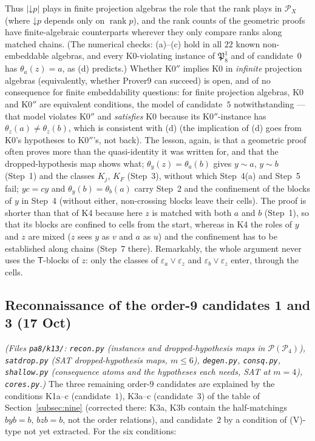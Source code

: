\documentclass[11pt]{amsart}
\theoremstyle{definition}
\renewcommand{\P}{\mathcal{P}}
\newcommand{\T}{\mathsf{T}}
\newcommand{\rk}{\operatorname{rank}}
\begin{document}
Thus $|\mathord\downarrow p|$ plays in finite projection algebras the role that the rank plays in $\P_X$ (where $\mathord\downarrow p$ depends only on $\rk p$), and the rank counts of the geometric proofs have finite-algebraic counterparts wherever they only compare ranks along matched chains. (The numerical checks: (a)--(c) hold in all $22$ known non-embeddable algebras, and every K0-violating instance of $\mathfrak P_8^1$ and of candidate~$0$ has $\theta_a(z)=a$, as (d) predicts.) Whether K0$''$ implies K0 in \emph{infinite} projection algebras (equivalently, whether Prover9 can succeed) is open, and of no consequence for finite embeddability questions: for finite projection algebras, K0 and K0$''$ are equivalent conditions, the model of candidate~$5$ notwithstanding --- that model violates K0$''$ and \emph{satisfies} K0 because its K0$''$-instance has $\theta_z(a)\ne\theta_z(b)$, which is consistent with (d) (the implication of (d) goes from K0's hypotheses to K0$''$'s, not back). The lesson, again, is that a geometric proof often proves more than the quasi-identity it was written for, and that the dropped-hypothesis map shows what; $\theta_y(z)=\theta_a(b)$ gives $y\sim a$, $y\sim b$ (Step~1) and the classes $K_j$, $K_F$ (Step~3), without which Step~4(a) and Step~5 fail; $yc=cy$ and $\theta_y(b)=\theta_b(a)$ carry Step~2 and the confinement of the blocks of $y$ in Step~4 (without either, non-crossing blocks leave their cells). The proof is shorter than that of K4 because here $z$ is matched with both $a$ and $b$ (Step~1), so that its blocks are confined to cells from the start, whereas in K4 the roles of $y$ and $z$ are mixed ($z$ sees $y$ as $v$ and $a$ as $u$) and the confinement has to be established along chains (Step~7 there). Remarkably, the whole argument never uses the $\T$-blocks of $z$: only the classes of $\varepsilon_a\vee\varepsilon_z$ and $\varepsilon_b\vee\varepsilon_z$ enter, through the cells.

\subsection{Reconnaissance of the order-9 candidates 1 and 3 (17 Oct)}\label{subsec:k13}

\emph{(Files \texttt{pa8/k13/}: \texttt{recon.py} (instances and dropped-hypothesis maps in $\P(\P_4)$), \texttt{satdrop.py} (SAT dropped-hypothesis maps, $m\le6$), \texttt{degen.py}, \texttt{consq.py}, \texttt{shallow.py} (consequence atoms and the hypotheses each needs, SAT at $m=4$), \texttt{cores.py}.)} The three remaining order-$9$ candidates are explained by the conditions K1a--c (candidate~$1$), K3a--c (candidate~$3$) of the table of Section~\ref{subsec:nine} (corrected there: K3a, K3b contain the half-matchings $byb=b$, $bzb=b$, not the order relations), and candidate~$2$ by a condition of (V)-type not yet extracted. For the six conditions:
\end{document}
